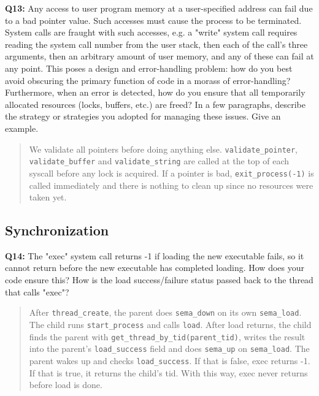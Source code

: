 \documentclass[a4paper,11pt]{paper}
\begin{document}
\textbf{Q13:} Any access to user program memory at a user-specified address can fail due to a bad pointer value.  Such accesses must cause the process to be terminated.  System calls are fraught with such accesses, e.g. a "write" system call requires reading the system call number from the user stack, then each of the call's three arguments, then an arbitrary amount of user memory, and any of these can fail at any point.  This poses a design and error-handling problem: how do you best avoid obscuring the primary function of code in a morass of error-handling?  Furthermore, when an error is detected, how do you ensure that all temporarily allocated resources (locks, buffers, etc.) are freed?  In a few paragraphs, describe the strategy or strategies you adopted for managing these issues.  Give an example.
\begin{quote}
We validate all pointers before doing anything else. \texttt{validate\_pointer},
\texttt{validate\_buffer} and \texttt{validate\_string} are called at the
top of each syscall before any lock is acquired. If a pointer is bad,
\texttt{exit\_process(-1)} is called immediately and there is nothing to
clean up since no resources were taken yet.
\end{quote}

\subsection{Synchronization}

\textbf{Q14:} The "exec" system call returns -1 if loading the new executable fails, so it cannot return before the new executable has completed loading.  How does your code ensure this?  How is the load success/failure status passed back to the thread that calls "exec"?
\begin{quote}
After \texttt{thread\_create}, the parent does \texttt{sema\_down} on its own \texttt{sema\_load}. The child runs \texttt{start\_process} and calls \texttt{load}. After load returns, the child finds the parent with \texttt{get\_thread\_by\_tid(parent\_tid)}, writes the result into the parent's \texttt{load\_success} field and does \texttt{sema\_up} on \texttt{sema\_load}.
The parent wakes up and checks \texttt{load\_success}. If that is false, exec returns -1. If that is true, it returns the child's tid. With this way, exec never returns before load is done.
\end{quote}
\end{document}
